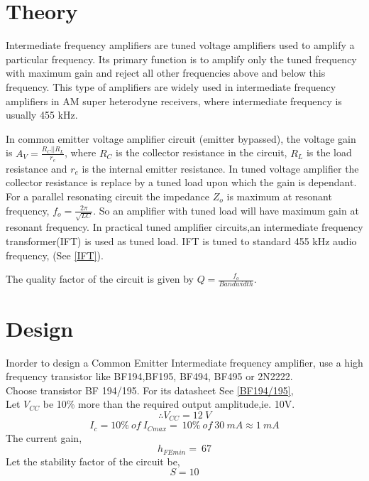 \documentclass{book}
\begin{document}
\section*{Theory}


Intermediate frequency amplifiers are tuned voltage amplifiers used to amplify a particular frequency. Its primary function is to amplify only the tuned frequency with maximum gain and reject all other frequencies above and below this frequency. This type of amplifiers are widely used in intermediate frequency amplifiers in AM super heterodyne receivers, where intermediate frequency is usually 455 kHz.

In common emitter voltage amplifier circuit (emitter bypassed), the voltage gain is $A_V=\frac{R_C||R_L}{r_e}$, where $R_C$ is the collector resistance in the circuit, $R_L$ is the load resistance and $r_e$ is the internal emitter resistance. In tuned voltage amplifier the collector resistance is replace by a tuned load upon which  the gain is dependant. For a parallel resonating circuit the impedance $Z_o$ is maximum at resonant frequency, $f_o=\frac{2\pi}{\sqrt{LC}}$. So an amplifier with tuned load will have maximum gain at resonant frequency.
In practical tuned amplifier circuits,an intermediate frequency transformer(IFT) is used as tuned load. IFT is tuned to standard 455 kHz audio frequency, (See \ref{IFT}).

The quality factor of the circuit is given by $Q=\frac{f_o}{Bandwidth}$.

\section*{Design}
Inorder to design a Common Emitter Intermediate frequency amplifier, use a high frequency transistor like BF194,BF195, BF494, BF495 or 2N2222.
\\Choose transistor BF 194/195. For its datasheet See \ref{BF194/195},\\


\noindent Let $V_{CC}$ be 10\% more than the required output amplitude,ie. 10V.
\begin{equation}
\therefore V_{CC}=12\ V
\end{equation}
\begin{equation}
I_c=10 \% \ of \  I_{Cmax} =\ 10\%\  of\  30\  mA \approx 1\ mA
\end{equation}
\noindent The current gain,
\begin{equation}
h_{FEmin}=\ 67
\end{equation}
Let the stability factor of the circuit be,
\begin{equation}
S=10
\end{equation}
\end{document}

